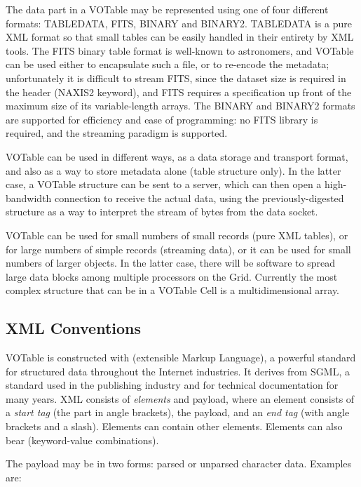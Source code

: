 The data part in a  VOTable may be represented using one of four
different formats: TABLEDATA, FITS, BINARY and BINARY2. TABLEDATA is a
pure XML format so that small tables can be easily handled in their
entirety by XML tools. The FITS binary table format is well-known to
astronomers, and VOTable can be used either to encapsulate such a
file, or to re-encode the metadata; unfortunately it is difficult to
stream FITS, since the dataset size is required in the header 
(NAXIS2 keyword), and FITS requires a specification up front of the maximum
size of its variable-length arrays. The BINARY and BINARY2 formats
are supported for efficiency and ease of programming: no FITS
library is required, and the streaming paradigm is supported.

VOTable can be used in different ways, as a data
storage and transport format, and also as a way to store metadata
alone (table structure only).  In the latter case, a
VOTable structure can be sent to a server, which can then open a
high-bandwidth connection to receive the actual data, using the
previously-digested structure as a way to interpret the stream of
bytes from the data socket. 

VOTable can be used for small numbers of small records (pure XML
tables), or for large numbers of simple records (streaming data), or
it can be used for small numbers of larger objects. In the latter
case, there will be software to spread large data blocks among
multiple processors on the Grid. Currently the most complex structure
that can be in a VOTable Cell is a multidimensional array. 


\subsection{XML Conventions}

VOTable is constructed with  (extensible Markup Language), a
powerful standard for structured data throughout the Internet
industries. It derives %
from SGML, %
a standard used in the publishing industry and for 
technical documentation for many years. XML
consists of {\it elements} and payload, where an element consists of
a {\it start tag} (the part in angle brackets), the payload, and an
{\it end tag} (with angle brackets and a slash). Elements can
contain other elements. Elements can also bear
{}
(keyword-value combinations).


The payload may be in two forms: parsed or unparsed character
data. Examples are:

